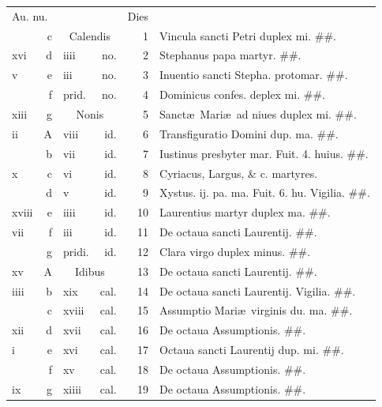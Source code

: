 \documentclass[a5paper,10pt]{book}
\def\ae{æ}
\begin{document}
\begin{center}
\begin{tabular}{l r l r r l}
\multicolumn{2}{l}{\color{red}Au. nu.} & & & \color{red} Dies & \\
 & c & \multicolumn{2}{c}{\color{red} Calendis} & 1 & \color{red} Vincula sancti Petri duplex mi. \color{black} \#\#.\\
xvi & d & iiii & no. & 2 & Stephanus papa martyr. \color{black} \#\#.\\
v & e & iii & no. & 3 & \color{red} Inuentio sancti Stepha. protomar. \color{black} \#\#.\\
 & f & \color{red} prid. & no. & 4 & Dominicus confes. deplex mi. \color{black} \#\#.\\
xiii & g & \multicolumn{2}{c}{\color{red} Nonis} & 5 & Sanct\ae \ Mari\ae \ ad niues duplex mi. \color{black} \#\#.\\
ii & \color{red} A & viii & id. & 6 & \color{red} Transfiguratio Domini dup. ma. \color{black} \#\#.\\
 & b & vii & id. & 7 & Iustinus presbyter mar. \color{red} Fuit. 4. huius. \color{black} \#\#.\\
x & c & vi & id. & 8 & Cyriacus, Largus, \& c. martyres. \\
 & d & v & id. & 9 & Xystus. ij. pa. ma. \color{red} Fuit. 6. hu. Vigilia. \color{black} \#\#.\\
xviii & e & iiii & id. & 10 & \color{red} Laurentius martyr duplex ma. \color{black} \#\#.\\
vii & f & iii & id. & 11 & De octaua sancti Laurentij. \color{black} \#\#.\\
 & g & \color{red} pridi. & id. & 12 & Clara virgo duplex minus. \color{black} \#\#.\\
xv & \color{red} A & \multicolumn{2}{c}{\color{red} Idibus} & 13 & De octaua sancti Laurentij. \#\#.\\
iiii & b & xix & cal. & 14 & De octaua sancti Laurentij. \color{red} Vigilia. \#\#.\\%
 & c & xviii & cal. & 15 & \color{red} Assumptio Mari\ae \ virginis du. ma. \color{black} \#\#.\\
xii & d & xvii & cal. & 16 & De octaua Assumptionis. \#\#.\\
i & e & xvi & cal. & 17 & Octaua sancti Laurentij dup. mi. \#\#.\\
 & f & xv & cal. & 18 & De octaua Assumptionis. \#\#.\\
ix & g & xiiii & cal. & 19 & De octaua Assumptionis. \color{black} \#\#.\\

\end{tabular}
\end{center}
\end{document}
